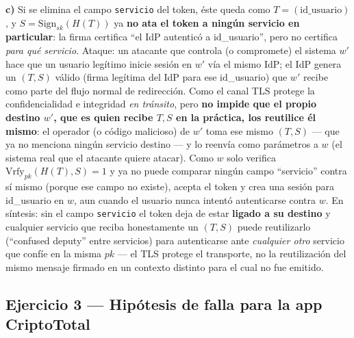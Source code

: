 \textbf{c)} Si se elimina el campo \texttt{servicio} del token, éste queda como
$T=(\text{id\_usuario})$, y $S=\mathrm{Sign}_{sk}(H(T))$ ya \textbf{no ata el token a ningún
servicio en particular}: la firma certifica ``el IdP autenticó a id\_usuario'', pero no
certifica \emph{para qué servicio}. Ataque: un atacante que controla (o compromete) el
sistema $w'$ hace que un usuario legítimo inicie sesión en $w'$ vía el mismo IdP; el IdP
genera un $(T,S)$ válido (firma legítima del IdP para ese id\_usuario) que $w'$ recibe como
parte del flujo normal de redirección. Como el canal TLS protege la confidencialidad e
integridad \emph{en tránsito}, pero \textbf{no impide que el propio destino $w'$, que es
quien recibe $T,S$ en la práctica, los reutilice él mismo}: el operador (o código malicioso)
de $w'$ toma ese mismo $(T,S)$ --- que ya no menciona ningún servicio destino --- y lo
reenvía como parámetros a $w$ (el sistema real que el atacante quiere atacar). Como $w$ solo
verifica $\mathrm{Vrfy}_{pk}(H(T),S)=1$ y ya no puede comparar ningún campo ``servicio''
contra sí mismo (porque ese campo no existe), acepta el token y crea una sesión para
id\_usuario en $w$, aun cuando el usuario nunca intentó autenticarse contra $w$. En síntesis:
sin el campo \texttt{servicio} el token deja de estar \textbf{ligado a su destino} y
cualquier servicio que reciba honestamente un $(T,S)$ puede reutilizarlo (``confused deputy''
entre servicios) para autenticarse ante \emph{cualquier otro} servicio que confíe en la misma
$pk$ --- el TLS protege el transporte, no la reutilización del mismo mensaje firmado en un
contexto distinto para el cual no fue emitido.

\subsection{Ejercicio 3 --- Hipótesis de falla para la app CriptoTotal}

